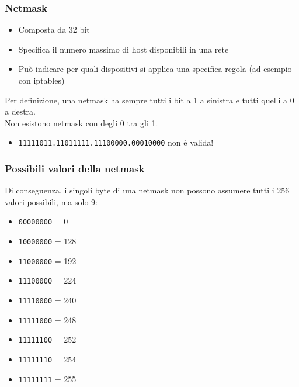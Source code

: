 \documentclass[aspectratio=169]{beamer}
\begin{document}
    \begin{frame}
        \frametitle{Netmask}
        \begin{itemize}
            \item Composta da 32 bit
            \item Specifica il numero massimo di host disponibili in una rete
            \item Può indicare per quali dispositivi si applica una specifica regola (ad esempio con iptables)
        \end{itemize}
        Per definizione, una netmask ha sempre tutti i bit a 1 a sinistra e tutti quelli a 0 a destra.
        \\
        Non esistono netmask con degli 0 tra gli 1.
        \begin{itemize}
            \item \texttt{11111011.11011111.11100000.00010000} non è valida!
        \end{itemize}
    \end{frame}
    
    \begin{frame}
        \frametitle{Possibili valori della netmask}
        Di conseguenza, i singoli byte di una netmask non possono assumere tutti i 256 valori possibili, ma solo 9:
        \vskip 0.5cm
        \begin{minipage}{\linewidth}
            \centering
            \begin{minipage}{0.45\linewidth}
                \begin{itemize}
                    \item \texttt{00000000} = 0
                    \item \texttt{10000000} = 128
                    \item \texttt{11000000} = 192
                    \item \texttt{11100000} = 224
                    \item \texttt{11110000} = 240
                \end{itemize}
            \end{minipage}
            \hspace{0.05\linewidth}
            \begin{minipage}{0.45\linewidth}
                \begin{itemize}
                    \item \texttt{11111000} = 248
                    \item \texttt{11111100} = 252
                    \item \texttt{11111110} = 254
                    \item \texttt{11111111} = 255
                \end{itemize}
            \end{minipage}
        \end{minipage}
    \end{frame}
    
\end{document}

